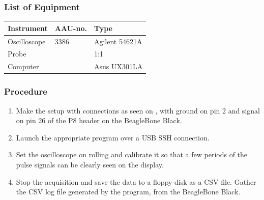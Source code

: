 \subsubsection{List of Equipment}
\begin{table}[H]
  \begin{tabular}{|l|l|p{4.3cm}|}
    \hline%
    \textbf{Instrument}                                   &  \textbf{AAU-no.} &  \textbf{Type}            \\
    \hline%
    Oscilloscope                                          &  3386             &  Agilent 54621A           \\
    \hline%
    Probe                                                 &                   &  1:1                      \\
    \hline%
      Computer                                            &                   &  Asus UX301LA  \\
    \hline%
  \end{tabular}
\end{table}

\subsubsection{Procedure}
\begin{enumerate}
  \item Make the setup with connections as seen on , with ground on pin 2 and signal on pin 26 of the P8 header on the BeagleBone Black.
  \item Launch the appropriate program over a USB SSH connection.
  \item Set the oscilloscope on rolling and calibrate it so that a few periods of the pulse signals can be clearly seen on the display.
  \item Stop the acquisition and save the data to a floppy-disk as a CSV file. Gather the CSV log file generated by the program, from the BeagleBone Black.
\end{enumerate}


